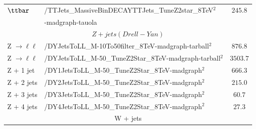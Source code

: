 \begin{table}[!ht]
\begin{center}
{\begin{tabular}{|l|l|c|}
$\ttbar$                           &   /TTJets\_MassiveBinDECAYTTJets\_TuneZ2star\_8TeV$^{2}$  &  $245.8$       \\
&-madgraph-tauola&\\
\hline
\multicolumn{3}{|c|}{$Z+jets (Drell-Yan)$ }\\
\hline
Z $\rightarrow \ell\ell$                 &   /DYJetsToLL\_M-10To50filter\_8TeV-madgraph-tarball$^{2}$      &   $876.8$               \\
Z $\rightarrow \ell\ell$                &   /DYJetsToLL\_M-50\_TuneZ2Star\_8TeV-madgraph-tarball$^{2}$    &   $3503.7$               \\
Z + 1 jet                           &   /DY1JetsToLL\_M-50\_TuneZ2Star\_8TeV-madgraph$^{2}$           &   $666.3$               \\
Z + 2 jets                          &   /DY2JetsToLL\_M-50\_TuneZ2Star\_8TeV-madgraph$^{2}$           &   $215.0$               \\
Z + 3 jets                          &   /DY3JetsToLL\_M-50\_TuneZ2Star\_8TeV-madgraph$^{2}$           &   $60.7$               \\
Z + 4 jets                          &   /DY4JetsToLL\_M-50\_TuneZ2Star\_8TeV-madgraph$^{2}$           &   $27.3$               \\
\hline
\multicolumn{3}{|c|}{W + jets }\\
\hline


\end{tabular}}
\end{center}
\end{table}
